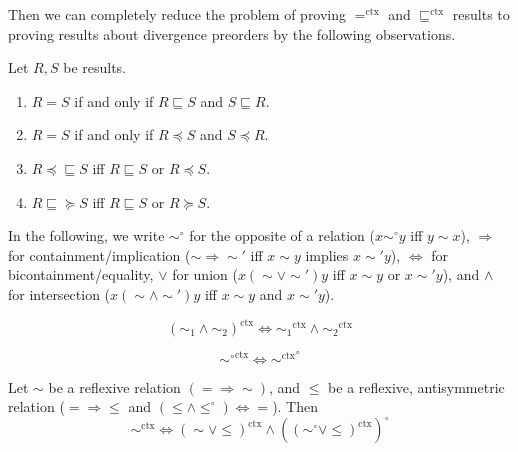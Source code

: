 \documentclass[acmsmall,nonacm]{acmart}
\newcommand{\ltdyn}{\sqsubseteq}
\newcommand{\ctxize}[1]{\mathrel{{#1}^{\text{ctx}}}}
\newcommand{\simsub}[1]{\mathrel{\sim_{#1}}}
\newcommand\errordivergeleft[0]{\preceq\ltdyn}
\newcommand\errordivergeright[0]{\ltdyn\succeq}
\begin{document}
{\begin{longonly}
Then we can completely reduce the problem of proving $\ctxize=$ and
$\ctxize\ltdyn$ results to proving results about divergence preorders
by the following observations.
\newcommand{\ctxsimi}[1]{\mathrel{\sim_{#1}^{\text{ctx}}}}
\begin{lemma} \label{lem:decomposing-result}
  Let $R, S$ be results.
  \begin{enumerate}
  \item $R = S$ if and only if $R \ltdyn S$ and $S \ltdyn R$.
  \item $R = S$ if and only if $R \preceq S$ and $S \preceq R$.
  \item $R \errordivergeleft S$ iff $R \ltdyn S$ or $R \preceq S$.
  \item $R \errordivergeright S$ iff $R \ltdyn S$ or $R \succeq S$.
  \end{enumerate}
\end{lemma}

In the following, we write $\sim^\circ$ for the opposite of a relation
($x \sim^\circ y$ iff $y \sim x$), $\Rightarrow$ for
containment/implication ($\sim \Rightarrow \sim'$ iff $x \sim y$ implies
$x \sim' y$), $\Leftrightarrow$ for bicontainment/equality, $\vee$ for
union ($x (\sim \vee \sim') y$ iff $x \sim y$ or $x \sim' y$), and
$\wedge$ for intersection ($x (\sim \wedge \sim') y$ iff $x \sim y$ and $x \sim' y$).

\begin{lemma} \label{lem:ctx-commutes-conjunction}
  \[
  \ctxize{(\simsub 1 \wedge \simsub 2)} \Leftrightarrow \ctxize{\simsub 1} \wedge \ctxize{\simsub 2}
  \]
\end{lemma}
 
\begin{lemma} \label{lem:ctx-commutes-dual}
  \[
  \ctxize{\sim^\circ} \Leftrightarrow \ctxize{\sim}^\circ
  \]
\end{lemma}

\begin{lemma} \label{lem:contextual-decomposition}
Let $\sim$ be a reflexive relation $(= \Rightarrow \sim)$, and $\leqslant$
be a reflexive, antisymmetric relation (${=} \Rightarrow {\leqslant}$ and
$(\leqslant \wedge {\leqslant^\circ}) \Leftrightarrow {=}$).  Then
\[
\ctxize\sim \Leftrightarrow \ctxize{(\sim \vee \leqslant)} \wedge (\ctxize{(\sim^\circ \vee \leqslant)})^\circ
\]
\end{lemma}


\end{longonly}}
\end{document}
